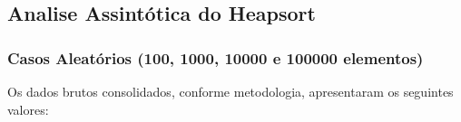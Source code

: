 \documentclass[a4paper, 12pt]{article}
\begin{document}
\subsection{Analise Assintótica do Heapsort}

\subsubsection{Casos Aleatórios (100, 1000, 10000 e 100000 elementos)}

\tab{ }Os dados brutos consolidados, conforme metodologia, apresentaram os seguintes valores:
\vspace{0.5cm}

\begin{minipage}{1.05\textwidth}
 \begin{minipage}[c]{0.46\textwidth}
 \centering 
\begin{tabular}{ccccc}


\end{tabular}
\end{minipage}
\end{minipage}
\end{document}
